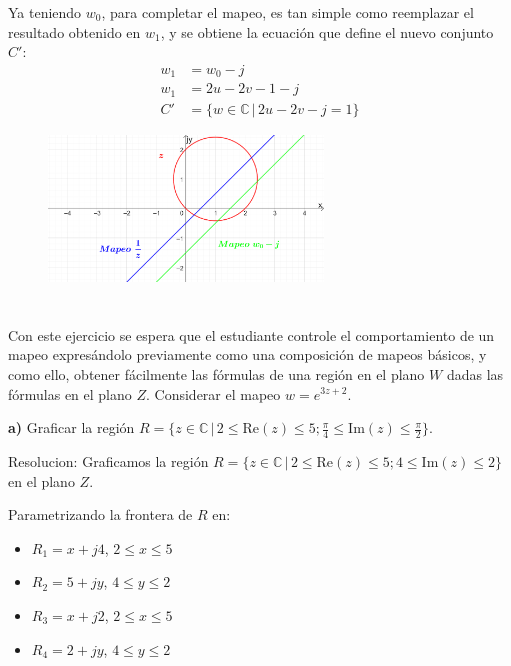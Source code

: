 \documentclass[12pt,a4paper]{report}
\begin{document}
Ya teniendo $w_0$, para completar el mapeo, es tan simple como reemplazar el resultado obtenido en $w_1$, y se obtiene la ecuación que define el nuevo conjunto \( C' \):\\
 
 
\begin{align*}
w_1 &= w_0-j \\[5pt]
w_1 &= 2u-2v-1-j \\[5pt]
C' &= \{w \in \mathbb{C} \, | \, 2u-2v-j=1\}
\end{align*}
 
 
\begin{figure}[htbp] %
    \centering %
    \includegraphics[width=0.65\textwidth]{./Imagenes/foto2Ej3.png} %
\end{figure}

\clearpage

\chapter{}%

Con este ejercicio se espera que el estudiante controle el comportamiento de un mapeo expresándolo previamente como una composición de mapeos básicos, y como ello, obtener fácilmente las fórmulas de una región en el plano $W$ dadas las fórmulas en el plano $Z$. Considerar el mapeo $w = e^{3z + 2}$.

\textbf{a)} Graficar la región $R = \{z \in \mathbb{C} \, | \, 2 \leq \text{Re}(z) \leq 5; \frac{\pi}{4} \leq \text{Im}(z) \leq \frac{\pi}{2}\}$.

Resolucion:
Graficamos la región $R = \{z \in \mathbb{C} \, | \, 2 \leq \text{Re}(z) \leq 5; 4 \leq \text{Im}(z) \leq 2\}$ en el plano $Z$.

Parametrizando la frontera de $R$ en:
\begin{itemize}
    \item $R_1 = x + j4$, $2 \leq x \leq 5$
    \item $R_2 = 5 + jy$, $4 \leq y \leq 2$
    \item $R_3 = x + j2$, $2 \leq x \leq 5$
    \item $R_4 = 2 + jy$, $4 \leq y \leq 2$
\end{itemize}
\end{document}
